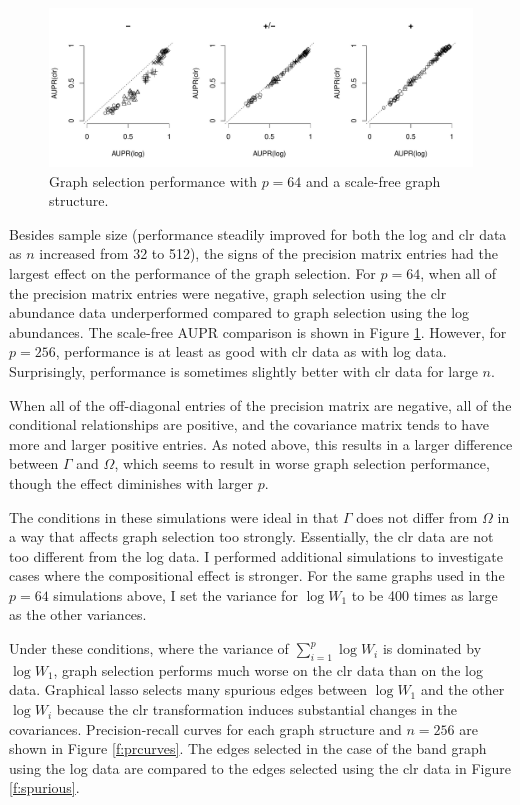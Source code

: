 \documentclass[10pt]{article}
\begin{document}
\begin{figure}
\caption{Graph selection performance with $p = 64$ and a scale-free graph structure.}
\label{f:perf64}
\begin{center}
\includegraphics[width=6.5in]{figs/sim-64-scalefree.pdf}
\end{center}
\end{figure}

Besides sample size (performance steadily improved for both the log and clr data as $n$ increased from 32 to 512), the signs of the precision matrix entries had the largest effect on the performance of the graph selection. For $p = 64$, when all of the precision matrix entries were negative, graph selection using the clr abundance data underperformed compared to graph selection using the log abundances. The scale-free AUPR comparison is shown in Figure \ref{f:perf64}. However, for $p = 256$, performance is at least as good with clr data as with log data. Surprisingly, performance is sometimes slightly better with clr data for large $n$.

When all of the off-diagonal entries of the precision matrix are negative, all of the conditional relationships are positive, and the covariance matrix tends to have more and larger positive entries. As noted above, this results in a larger difference between $\Gamma$ and $\Omega$, which seems to result in worse graph selection performance, though the effect diminishes with larger $p$.

The conditions in these simulations were ideal in that $\Gamma$ does not differ from $\Omega$ in a way that affects graph selection too strongly. Essentially, the clr data are not too different from the log data. I performed additional simulations to investigate cases where the compositional effect is stronger. For the same graphs used in the $p = 64$ simulations above, I set the variance for $\log W_1$ to be 400 times as large as the other variances.

Under these conditions, where the variance of $\sum_{i=1}^p \log W_i$ is dominated by $\log W_1$, graph selection performs much worse on the clr data than on the log data. Graphical lasso selects many spurious edges between $\log W_1$ and the other $\log W_i$ because the clr transformation induces substantial changes in the covariances. Precision-recall curves for each graph structure and $n = 256$ are shown in Figure \ref{f:prcurves}. The edges selected in the case of the band graph using the log data are compared to the edges selected using the clr data in Figure \ref{f:spurious}.
\end{document}
